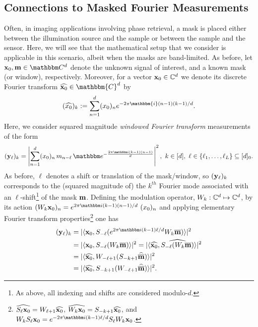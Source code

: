 \subsection{Connections to Masked Fourier Measurements}
\label{sec:STFT}
%
%
Often, in imaging applications involving phase retrieval, a mask is placed either between the illumination source and the sample or between the sample and the sensor. Here, we will see that the mathematical setup that we consider is applicable in this scenario, albeit when the masks are band-limited.  As before, let $\x_0, \m \in \mathbbm C^d$ denote the unknown signal of interest, and a known mask (or window), respectively. Moreover, for a vector $\mathbf x_0 \in \mathbb{C}^d$ we denote its discrete Fourier transform $\widehat{\x_0} \in \mathbbm{C}^d$ by $$(\widehat{x_0})_k :=\sum_{n=1}^d (x_0)_n e^{-2\pi \mathbbm{i} (n-1)(k-1)/d}.$$  Here, we consider squared magnitude \emph{windowed Fourier
transform} measurements of the form 
%
\begin{equation}
  ({\y_\ell})_k = \left \vert \sum_{n=1}^d (x_0)_n \, m_{n-\ell} \,
      \mathbbm e^{-\frac{2\pi \mathbbm i (k-1) (n-1)}d} 
      \right \vert^2, ~ k \in [d],
      ~ \ell \in \{\ell_1, \dots, \ell_L\} \subset 
        [d]_0.
  \label{eq:STFT_measurements}
\end{equation}
%
As before, $\ell$ denotes a shift or translation of the mask/window, so $({\mathbf y_\ell})_k$ corresponds to the (squared magnitude of) the $k^{th}$ Fourier mode associated with an $\ell$-shift\footnote{As above, all indexing and shifts are considered modulo-$d$.} of the mask $\mathbf m$. Defining the modulation operator, $W_k: \mathbb{C}^d \mapsto \mathbb{C}^d$,  by its action $(W_k \x_0)_n = e^{2\pi \mathbbm i (k-1)(n-1)/d}~(x_0)_n$ and applying elementary Fourier transform properties\footnote{$\widehat{S_\ell \mathbf x_0}=W_{\ell+1}\widehat{\mathbf x_0}$, $\widehat{W_k \mathbf x_0}=S_{-k+1}\widehat{\mathbf x_0}$, and $W_k S_\ell \x_0 = e^{-2\pi \mathbbm i (k-1)\ell/d} S_\ell W_k \x_0$.} one has
%
\begin{align}
  (\y_\ell)_k &=  \lvert \langle  \x_0, S_{-\ell}(e^{2\pi \mathbbm i (k-1)\ell/d}W_k\overline{\m} )\rangle \rvert^2 \notag \\
  & =  \lvert \langle  \x_0, S_{-\ell}(W_k \overline{\m} )\rangle \rvert^2 \notag 
  =  \lvert \langle  \widehat{\x_0}, \widehat{S_{-\ell}(W_{k} \overline{\m} )}\rangle \rvert^2 \notag \\
  & = \lvert \langle  \widehat{\x_0}, W_{-\ell+1}(S_{-k+1}\widehat{\overline{\m}} )\rangle \rvert^2 \notag \\ 
  &=\lvert \langle  \widehat{\x_0}, S_{-k+1}(W_{-\ell+1}\widehat{\overline{\m}} )\rangle \rvert^2.
\end{align}


